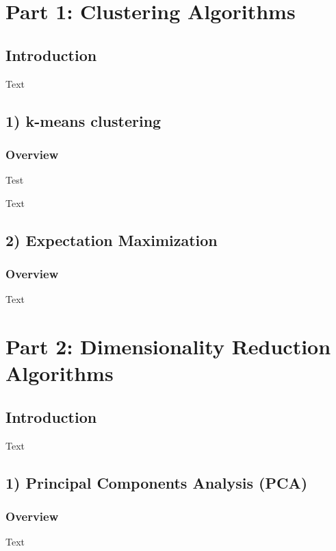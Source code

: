 \documentclass[h]{article}
\begin{document}
\section*{Part 1: Clustering Algorithms}
\subsection*{Introduction}  
Text 

\subsection*{1) k-means clustering}  
\subsubsection*{Overview}
Test
 

Text

\subsection*{2) Expectation Maximization}  
\subsubsection*{Overview}
Text

 
\section*{Part 2: Dimensionality Reduction Algorithms}
\subsection*{ Introduction}  
Text

\subsection*{1) Principal Components Analysis (PCA)}  
\subsubsection*{Overview}
Text
\end{document}

